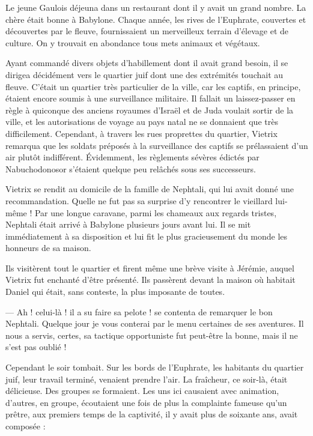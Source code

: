 \documentclass[a4paper, 11pt, oneside, polutonikogreek, french]{article}
\begin{document}
Le jeune Gaulois déjeuna dans un restaurant dont il y avait un grand nombre. La chère était bonne à Babylone. Chaque année, les rives de l'Euphrate, couvertes et découvertes par le fleuve, fournissaient un merveilleux terrain d'élevage et de culture. On y trouvait en abondance tous mets animaux et végétaux.

\bigskip
\centerline{\EightStarTaper}
\centerline{\EightStarTaper\EightStarTaper}
\bigskip

Ayant commandé divers objets d'habillement dont il avait grand besoin, il se dirigea décidément vers le quartier juif dont une des extrémités touchait au fleuve. C'était un quartier très particulier de la ville, car les captifs, en principe, étaient encore soumis à une surveillance militaire. Il fallait un laissez-passer en règle à quiconque des anciens royaumes d'Israël et de Juda voulait sortir de la ville, et les autorisations de voyage au pays natal ne se donnaient que très difficilement. Cependant, à travers les rues proprettes du quartier, Vietrix remarqua que les soldats préposés à la surveillance des captifs se prélassaient d'un air plutôt indifférent. Évidemment, les règlements sévères édictés par Nabuchodonosor s'étaient quelque peu relâchés sous ses successeurs.

Vietrix se rendit au domicile de la famille de Nephtali, qui lui avait donné une recommandation. Quelle ne fut pas sa surprise d'y rencontrer le vieillard lui-même ! Par une longue caravane, parmi les chameaux aux regards tristes, Nephtali était arrivé à Babylone plusieurs jours avant lui. Il se mit immédiatement à sa disposition et lui fit le plus gracieusement du monde les honneurs de sa maison.

Ils visitèrent tout le quartier et firent même une brève visite à Jérémie, auquel Vietrix fut enchanté d'être présenté. Ils passèrent devant la maison où habitait Daniel qui était, sans conteste, la plus imposante de toutes.

--- Ah ! celui-là ! il a su faire sa pelote ! se contenta de remarquer le bon Nephtali. Quelque jour je vous conterai par le menu certaines de ses aventures. Il nous a servis, certes, sa tactique opportuniste fut peut-être la bonne, mais il ne s'est pas oublié !

Cependant le soir tombait. Sur les bords de l'Euphrate, les habitants du quartier juif, leur travail terminé, venaient prendre l'air. La fraîcheur, ce soir-là, était délicieuse. Des groupes se formaient. Les uns ici causaient avec animation, d'autres, en groupe, écoutaient une fois de plus la complainte fameuse qu'un prêtre, aux premiers temps de la captivité, il y avait plus de soixante ans, avait composée :
\end{document}
